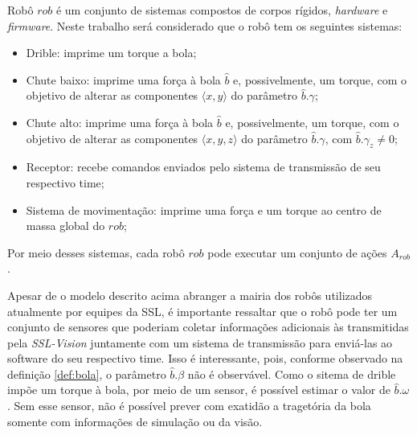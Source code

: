 
\begin{defi}[Robô]
  Robô $rob$ é um conjunto de sistemas compostos de corpos rígidos,
  \textit{hardware} e \textit{firmware}. Neste trabalho será considerado
  que o robô tem os seguintes sistemas:

  \begin{itemize}
    \item Drible: imprime um torque a bola;
    \item Chute baixo: imprime uma força à bola $\hat{b}$
          e, possivelmente, um torque, com o objetivo de
          alterar as componentes $\langle x,y \rangle$
          do parâmetro $\hat{b}.\gamma$;
    \item Chute alto: imprime uma força à bola $\hat{b}$
          e, possivelmente, um torque, com o objetivo de
          alterar as componentes $\langle x,y,z \rangle$
          do parâmetro $\hat{b}.\gamma$, com $\hat{b}.\gamma_z \neq 0$;
    \item Receptor: recebe comandos enviados pelo sistema de
          transmissão de seu respectivo time;
    \item Sistema de movimentação: imprime uma força e um torque
          ao centro de massa global do $rob$;
  \end{itemize}

  Por meio desses sistemas, cada robô $rob$ pode executar um conjunto de ações $A_{rob}$.

  Apesar de o modelo descrito acima abranger a mairia dos
  robôs utilizados atualmente por equipes da SSL, é importante
  ressaltar que o robô pode ter um conjunto de sensores que
  poderiam coletar informações adicionais às transmitidas pela
  \textit{SSL-Vision} juntamente com um sistema de transmissão
  para enviá-las ao software do seu respectivo time. Isso é
  interessante, pois, conforme observado na definição \ref{def:bola},
  o parâmetro $\hat{b}.\beta$ não é observável. Como o sitema de
  drible impõe um torque à bola, por meio de um sensor, é possível
  estimar o valor de $\hat{b}.\omega$. Sem esse sensor, não é possível
  prever com exatidão a tragetória da bola somente com informações de
  simulação ou da visão.

\end{defi}



